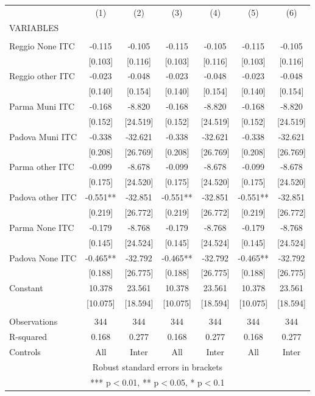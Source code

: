 \begin{tabular}{lcccccc} \hline
 & (1) & (2) & (3) & (4) & (5) & (6) \\
VARIABLES &  &  &  &  &  &  \\ \hline
 &  &  &  &  &  &  \\
Reggio None ITC & -0.115 & -0.105 & -0.115 & -0.105 & -0.115 & -0.105 \\
 & [0.103] & [0.116] & [0.103] & [0.116] & [0.103] & [0.116] \\
Reggio other ITC & -0.023 & -0.048 & -0.023 & -0.048 & -0.023 & -0.048 \\
 & [0.140] & [0.154] & [0.140] & [0.154] & [0.140] & [0.154] \\
Parma Muni ITC & -0.168 & -8.820 & -0.168 & -8.820 & -0.168 & -8.820 \\
 & [0.152] & [24.519] & [0.152] & [24.519] & [0.152] & [24.519] \\
Padova Muni ITC & -0.338 & -32.621 & -0.338 & -32.621 & -0.338 & -32.621 \\
 & [0.208] & [26.769] & [0.208] & [26.769] & [0.208] & [26.769] \\
Parma other ITC & -0.099 & -8.678 & -0.099 & -8.678 & -0.099 & -8.678 \\
 & [0.175] & [24.520] & [0.175] & [24.520] & [0.175] & [24.520] \\
Padova other ITC & -0.551** & -32.851 & -0.551** & -32.851 & -0.551** & -32.851 \\
 & [0.219] & [26.772] & [0.219] & [26.772] & [0.219] & [26.772] \\
Parma None ITC & -0.179 & -8.768 & -0.179 & -8.768 & -0.179 & -8.768 \\
 & [0.145] & [24.524] & [0.145] & [24.524] & [0.145] & [24.524] \\
Padova None ITC & -0.465** & -32.792 & -0.465** & -32.792 & -0.465** & -32.792 \\
 & [0.188] & [26.775] & [0.188] & [26.775] & [0.188] & [26.775] \\
Constant & 10.378 & 23.561 & 10.378 & 23.561 & 10.378 & 23.561 \\
 & [10.075] & [18.594] & [10.075] & [18.594] & [10.075] & [18.594] \\
 &  &  &  &  &  &  \\
Observations & 344 & 344 & 344 & 344 & 344 & 344 \\
R-squared & 0.168 & 0.277 & 0.168 & 0.277 & 0.168 & 0.277 \\
 Controls & All & Inter & All & Inter & All & Inter \\ \hline
\multicolumn{7}{c}{ Robust standard errors in brackets} \\
\multicolumn{7}{c}{ *** p$<$0.01, ** p$<$0.05, * p$<$0.1} \\
\end{tabular}
